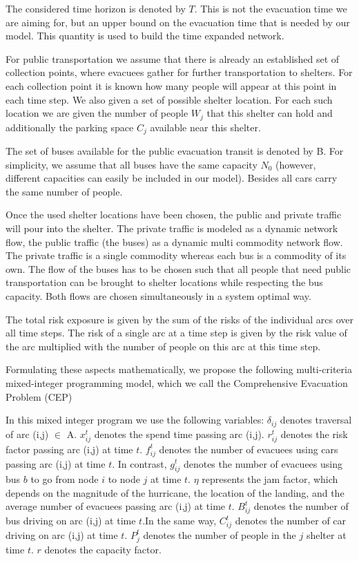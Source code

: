 \documentclass{mcmthesis}
\begin{document}
The considered time horizon is denoted by $T$. This is not the evacuation time we are aiming for, but an upper bound on the evacuation time that is needed by our model. This quantity is used to build the time expanded network.

For public transportation we assume that there is already an established set of collection points, where evacuees gather for further transportation to shelters. For each collection point it is known how many people will appear at this point in each time step. We also given a set of possible shelter location. For each such location we are given the number of people ${W_j}$ that this shelter can hold and additionally the parking space ${C_j}$ available near this shelter.

The set of buses available for the public evacuation transit is denoted by B. For simplicity, we assume that all buses have the same capacity ${N_0}$ (however, different capacities can easily be included in our model). Besides all cars carry the same number of people.

Once the used shelter locations have been chosen, the public and private traffic will pour into the shelter. The private traffic is modeled as a dynamic network flow, the public traffic (the buses) as a dynamic multi commodity network flow. The private traffic is a single commodity whereas each bus is a commodity of its own. The flow of the buses has to be chosen such that all people that need public transportation can be brought to shelter locations while respecting the bus capacity. Both flows are chosen simultaneously in a system optimal way.

The total risk exposure is given by the sum of the risks of the individual arcs over all time steps. The risk of a single arc at a time step is given by the risk value of the arc multiplied with the number of people on this arc at this time step.

Formulating these aspects mathematically, we propose the following multi-criteria mixed-integer programming model, which we call the Comprehensive Evacuation Problem (CEP)\cite{Murray2013Evacuation,Ng2015Sharp,Ng2010Reliable}

In this mixed integer program we use the following variables: $\delta _{ij}$ denotes traversal of arc (i,j) $ \in $ A. $x_{ij}^t$ denotes the spend time passing arc (i,j). $r_{ij}^t$ denotes the risk factor passing arc (i,j) at time $t$. $f_{ij}^t$ denotes the number of evacuees using cars passing arc (i,j) at time $t$. In contrast, $g_{ij}^t$ denotes the number of evacuees using bus $b$ to go from node $i$ to node $j$ at time $t$. $\eta $ represents the jam factor, which depends on the magnitude of the hurricane, the location of the landing, and the average number of evacuees passing arc (i,j) at time $t$. $B_{ij}^t$ denotes the number of bus driving on arc (i,j) at time $t$.In the same way, $C_{ij}^t$ denotes the number of car driving on arc (i,j) at time $t$. $P_j^t$  denotes the number of people in the $j$ shelter at time $t$. $r$ denotes the capacity factor.
\end{document}
